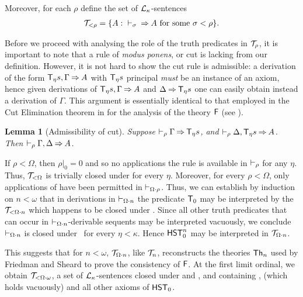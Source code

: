 \documentclass[UKenglish,cleveref,DIV=12]{scrartcl}
\newtheorem{lemma}[theorem]{Lemma}%
\theoremstyle{definition}
\theoremstyle{definition}
\newcommand{\gelhighlight}[1]{\highlight[magenta]{#1}}
\begin{document}
Moreover, for each $\rho$ define the set of $\mathcal{L}_\kappa$-sentences
\begin{align*}
	\mathcal{T}_{<\rho}=\{ A:{}\vdash_\sigma  {} \mathbin\Rightarrow A\text{ for some $\sigma<\rho$}\}.
\end{align*}

Before we proceed with analysing the role of the truth predicates in
$\mathcal{T}_\rho$, it is important to note that a rule of \emph{modus ponens}, or cut
is lacking from our definition. However, it is not hard to show the cut rule is
admissible: a derivation of
the form $ \mathsf{T}_\eta s , \Gamma \mathbin\Rightarrow A $ with $ \mathsf{T}_\eta s$ principal \emph{must} be an
instance of an axiom, hence given derivations of $ \mathsf{T}_\eta s , \Gamma \mathbin\Rightarrow A $
and $\Delta \mathbin\Rightarrow \mathsf{T}_\eta s $ one can easily obtain instead a derivation of $\Gamma$.
This argument is essentially identical to that employed in the Cut Elimination
theorem in \cite{LeiRat10} for the analysis of the theory $\mathsf{F}$ (see \cite[Thm.~3.7]{LeiRat10}).
\begin{lemma}[Admissibility of cut]\label{thm:FFCutElim}
	Suppose $\vdash_\rho \Gamma \mathbin\Rightarrow \mathsf{T}_\eta s $, and $\vdash_\rho \Delta,
  \mathsf{T}_\eta s  \mathbin\Rightarrow A $. Then $\vdash_\rho \Gamma,\Delta \mathbin\Rightarrow A$.
\end{lemma}

If $\rho<\Omega$, then $\rho|_0=0$ and so no applications the rule \Nec\eta{} is available in $\vdash_\rho $ for any $\eta$. 
Thus, $\mathcal{T}_{\mathord<\Omega}$ is trivially closed under \Conec\eta{} for every $\eta$. \gelhighlight{Simple but not `trivial'}
Moreover, for every
$\rho<\Omega$, only applications of  have been permitted in $\vdash_{\Omega\cdot\rho}$. Thus, we can
establish by induction on $n<\omega$ that in derivations in $\vdash_{\Omega\cdot n}$ the predicate $\mathsf{T}_0$ may be interpreted by the $\mathcal{T}_{<\Omega\cdot n}$ which happens to be closed under .
Since all other truth predicates that can occur in $\vdash_{\Omega\cdot n}$-derivable sequents may be interpreted vacuously, we conclude $\vdash_{\Omega\cdot n}$ is closed under
\Conec\eta\ for every $\eta<\kappa$. 
Hence $\mathsf{HST}_0^n$ may be interpreted
in $\mathcal{T}_{\Omega\cdot n}$.

This suggests that for $n<\omega$, $\mathcal{T}_{\Omega\cdot n}$, like $\mathcal{T}_n$, reconstructs
the theories $\mathsf{Th}_n$ used by Friedman and Sheard to prove the consistency of
$\mathsf{F}$. At the first limit ordinal,
we obtain $\mathcal{T}_{<\Omega\cdot\omega}$, a set of $\mathcal{L}_\kappa$-sentences closed under
 and , and containing ,  (which holds vacuously) and all other axioms of $\mathsf{HST}_0$.
\end{document}
